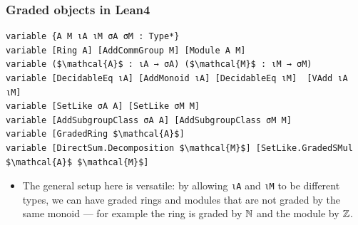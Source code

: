 \documentclass[9pt]{beamer}
\begin{document}
\begin{frame}[fragile]
\frametitle{Graded objects in Lean4}

\begin{lstlisting}[mathescape=true, extendedchars=true]
variable {A M ιA ιM σA σM : Type*} 
variable [Ring A] [AddCommGroup M] [Module A M]
variable ($\mathcal{A}$ : ιA → σA) ($\mathcal{M}$ : ιM → σM)
variable [DecidableEq ιA] [AddMonoid ιA] [DecidableEq ιM]  [VAdd ιA ιM]
variable [SetLike σA A] [SetLike σM M]
variable [AddSubgroupClass σA A] [AddSubgroupClass σM M] 
variable [GradedRing $\mathcal{A}$] 
variable [DirectSum.Decomposition $\mathcal{M}$] [SetLike.GradedSMul $\mathcal{A}$ $\mathcal{M}$]
\end{lstlisting}
\begin{itemize}
  \item The general setup here is versatile: by allowing \lstinline|ιA| and \lstinline|ιM| to be different types, we can have graded rings and modules that are not graded by the same monoid --- for example the ring is graded by $\mathbb{N}$ and the module by $\mathbb{Z}$.
\end{itemize}
\end{frame}
\end{document}
